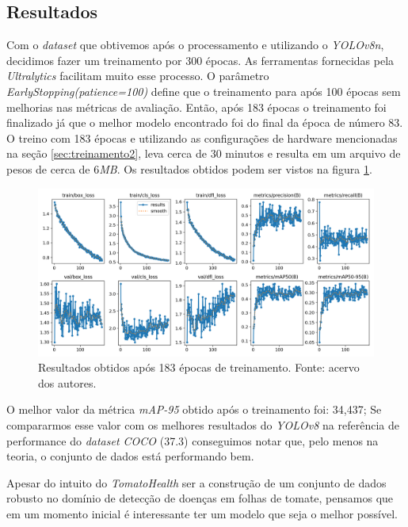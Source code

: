 \subsection{Resultados}
\label{sec:resultados}
Com o \emph{dataset} que obtivemos após o processamento e utilizando o \emph{YOLOv8n}, decidimos fazer um treinamento por 300 épocas. As ferramentas fornecidas pela \emph{Ultralytics} facilitam muito esse processo. O parâmetro \emph{EarlyStopping(patience=100)} define que o treinamento para após 100 épocas sem melhorias nas métricas de avaliação. Então, após 183 épocas o treinamento foi finalizado já que o melhor modelo encontrado foi do final da época de número 83. O treino com 183 épocas e utilizando as configurações de hardware mencionadas na seção \ref{sec:treinamento2}, leva cerca de 30 minutos e resulta em um arquivo de pesos de cerca de 6\emph{MB}. Os resultados obtidos podem ser vistos na figura \ref{fig:resultados-treinamento}.

\begin{figure}[htb!]
    \centering
    \includegraphics[width=1\linewidth]{images/results.png}
    \caption{Resultados obtidos após 183 épocas de treinamento. Fonte: acervo dos autores.}
    \label{fig:resultados-treinamento}
\end{figure}

O melhor valor da métrica \emph{mAP-95} obtido após o treinamento foi: 34,437; Se compararmos esse valor com os melhores resultados do \emph{YOLOv8} na referência de performance do \emph{dataset COCO} (37.3) conseguimos notar que, pelo menos na teoria, o conjunto de dados está performando bem.

Apesar do intuito do \emph{TomatoHealth} ser a construção de um conjunto de dados robusto no domínio de detecção de doenças em folhas de tomate, pensamos que em um momento inicial é interessante ter um modelo que seja o melhor possível. 

